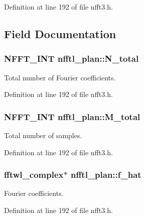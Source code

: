 Definition at line 192 of file nfft3.\-h.



\subsection{Field Documentation}
\hypertarget{structnfftl__plan_a6e280dc31ae95edc9f5e548d83c939b2}{
\subsubsection[{N\-\_\-total}]{\setlength{\rightskip}{0pt plus 5cm}N\-F\-F\-T\-\_\-\-I\-N\-T nfftl\-\_\-plan\-::\-N\-\_\-total}}\label{structnfftl__plan_a6e280dc31ae95edc9f5e548d83c939b2}


Total number of Fourier coefficients. 



Definition at line 192 of file nfft3.\-h.

\hypertarget{structnfftl__plan_a7e4456eca1d77610cadfa50c0eca6d98}{
\subsubsection[{M\-\_\-total}]{\setlength{\rightskip}{0pt plus 5cm}N\-F\-F\-T\-\_\-\-I\-N\-T nfftl\-\_\-plan\-::\-M\-\_\-total}}\label{structnfftl__plan_a7e4456eca1d77610cadfa50c0eca6d98}


Total number of samples. 



Definition at line 192 of file nfft3.\-h.

\hypertarget{structnfftl__plan_ad5cf4ad0369bdaf07f6acd801e6b9e5e}{
\subsubsection[{f\-\_\-hat}]{\setlength{\rightskip}{0pt plus 5cm}fftwl\-\_\-complex$\ast$ nfftl\-\_\-plan\-::f\-\_\-hat}}\label{structnfftl__plan_ad5cf4ad0369bdaf07f6acd801e6b9e5e}


Fourier coefficients. 



Definition at line 192 of file nfft3.\-h.

